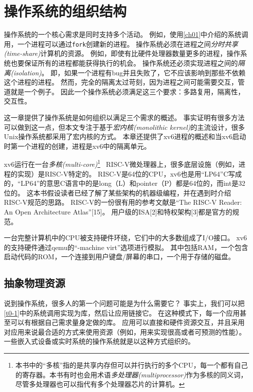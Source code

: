 \chapter{操作系统的组织结构}\label{ch02}

操作系统的一个核心需求是同时支持多个活动。
例如，使用\autoref{ch01}中介绍的系统调用，一个进程可以通过\texttt{fork}创建新的进程。
操作系统必须在进程之间\emph{分时共享(time-share)}计算机的资源。
例如，即使有比硬件处理器数量更多的进程，操作系统也要保证所有的进程都能获得执行的机会。
操作系统还必须实现进程之间的\emph{隔离(isolation)}。
即，如果一个进程有bug并且失败了，它不应该影响到那些不依赖这个进程的进程。
然而，完全的隔离太过苛刻，因为进程之间可能需要交互，管道就是一个例子。
因此一个操作系统必须满足这三个要求：多路复用，隔离性，交互性。

这一章提供了操作系统是如何组织以满足三个需求的概述。
事实证明有很多方法可以做到这一点，但本文专注于基于\emph{宏内核(monolithic kernel)}的主流设计，很多Unix操作系统都采用了宏内核的方式。
本章还提供了xv6进程的概述和当xv6启动时第一个进程的创建，进程是xv6中的隔离单元。

xv6运行在一台\emph{多核(multi-core)}\footnote{本书中的“多核”指的是共享内存但可以并行执行的多个CPU，每一个都有自己的寄存器。本书有时也会用术语\emph{多处理器(multiprocessor)}作为多核的同义词，尽管多处理器也可以指代有多个处理器芯片的计算机。}  RISC-V微处理器上，很多底层设施（例如，进程的实现）是RISC-V特定的。
RISC-V是64位的CPU，xv6也是用“LP64”C写成的，“LP64”的意思C语言中的是long（L）和pointer（P）都是64位的，而int是32位的。
这本书假设读者已经了解了某些架构的机器级编程，并在遇到时介绍RISC-V规范的思路。
RISC-V的一份很有用的参考文献是“The RISC-V Reader: An Open Architecture Atlas”[15]。
用户级的ISA[2]和特权架构[3]都是官方的规范。

一台完整计算机中的CPU被支持硬件环绕，它们中的大多数组成了I/O接口。
xv6的支持硬件通过qemu的“-machine virt”选项进行模拟。
其中包括RAM，一个包含启动代码的ROM，一个连接到用户键盘/屏幕的串口，一个用于存储的磁盘。

\section{抽象物理资源}
说到操作系统，很多人的第一个问题可能是为什么需要它？
事实上，我们可以把\autoref{t0-1}中的系统调用实现为库，然后让应用链接它。
在这种模式下，每一个应用甚至可以有根据自己需求量身定做的库。
应用可以直接和硬件资源交互，并且采用对应用来说最合适的方式来使用资源（例如，用来实现很高或者可预测的性能）。
一些嵌入式设备或实时系统的操作系统就是以这种方式组织的。

